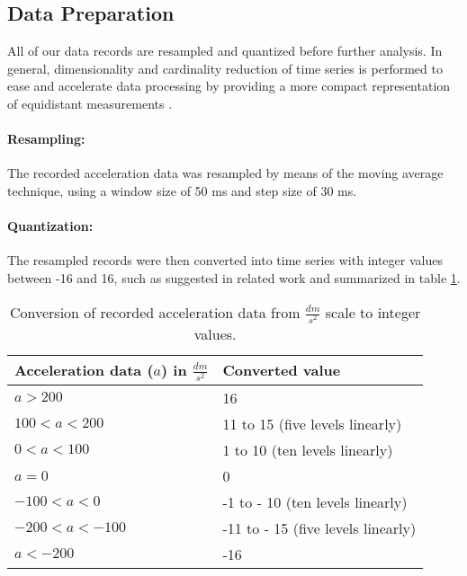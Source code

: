 \subsection{Data Preparation} \label{data_preparation}

All of our data records are resampled and quantized before further analysis. In general, dimensionality and cardinality reduction of time series is performed to ease and accelerate data processing by providing a more compact representation of equidistant measurements \cite{liu2009uwave}.

\paragraph{Resampling:} The recorded acceleration data was resampled by means of the moving average technique, using a window size of 50 ms and step size of 30 ms.

\paragraph{Quantization:} The resampled records were then converted into time series with integer values between -16 and 16, such as suggested in related work \cite{liu2009uwave} and summarized in table \ref{table:conversion}.

\begin{table}
    \begin{center}
        \begin{tabularx}{\textwidth}{XX}
            \hline
            \textbf{Acceleration data ($a$) in $\frac{dm}{s^2}$} & \textbf{Converted value}\\
            \hline
            $a > 200$ & 16\\
            $100 < a < 200$ & 11 to 15 (five levels linearly)\\
            $0 < a < 100$ & 1 to 10 (ten levels linearly)\\
            $a = 0$ & 0\\
            $-100 < a < 0$ & -1 to - 10 (ten levels linearly)\\
            $-200 < a < -100$ & -11 to - 15 (five levels linearly)\\
            $a < -200$ & -16\\
            \hline
        \end{tabularx}
    \end{center}
    \caption{Conversion of recorded acceleration data from $\frac{dm}{s^2}$ scale to integer values.}
	\label{table:conversion}
\end{table}
